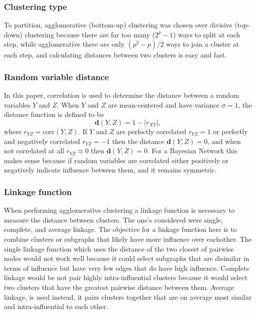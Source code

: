 \documentclass[twoside,11pt]{article}
\let\mbf\mathbf
\begin{document}
\subsubsection{Clustering type}

To partition, agglomerative (bottom-up) clustering was chosen over divisive (top-down) clustering because there are far too many ($2^p-1$) ways to split at each step, while agglomerative there are only $(p^2-p)/2$ ways to join a cluster at each step, and calculating distances between two clusters is easy and fast.


\subsubsection{Random variable distance}
In this paper, correlation is used to determine the distance between a random variables $Y$ and $Z$. When $Y$ and $Z$ are mean-centered and have variance $\sigma=1$, the distance function is defined to be
\begin{equation}
    \mbf{d}(Y,Z)=1-|r_{XY}|,
\end{equation}
where $r_{YZ}=\text{corr}(Y,Z)$. If $Y$ and $Z$ are perfectly correlated $r_{YZ}=1$ or perfectly and negatively correlated $r_{YZ}=-1$ then the distance $\mbf{d}(Y,Z)=0$, and when not correlated at all $r_{YZ}\approx0$ then $\mbf{d}(Y,Z)=0$. For a Bayesian Network this makes sense because if random variables are correlated either positively or negatively indicate influence between them, and it remains symmetric.


\subsubsection{Linkage function}
When performing agglomerative clustering a linkage function is necessary to measure the distance between clusters. The one's considered were single, complete, and average linkage. The objective for a linkage function here is to combine clusters or subgraphs that likely have more influence over eachother. The single linkage function which uses the distance of the two closest of pairwise nodes would not work well because it could select subgraphs that are disimilar in terms of influence but have very few edges that do have high influence. Complete linkage would be not pair highly intra-influential clusters because it would select two clusters that have the greatest pairwise distance between them. Average linkage, is used instead, it pairs clusters together that are on average most similar and intra-influential to each other.
\end{document}
